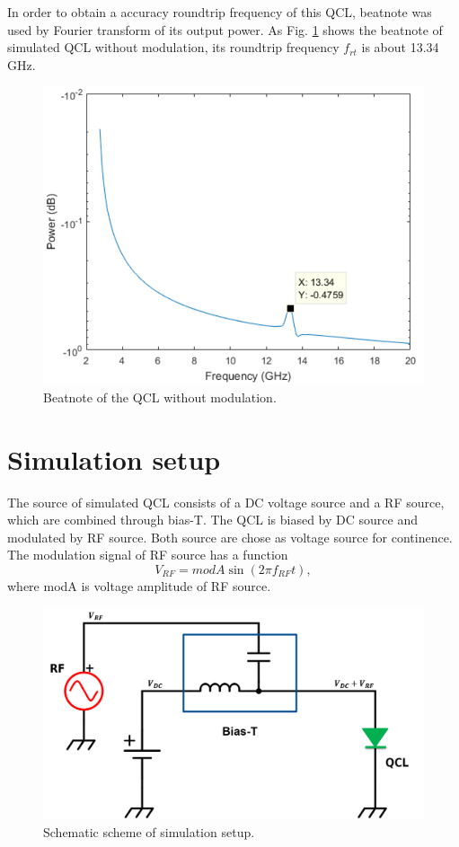 \documentclass[11pt,final]{scrbook}
\begin{document}
In order to obtain a accuracy roundtrip frequency of this QCL, beatnote was used by Fourier transform of its output power. As Fig. \ref{fig:beatnote_noRF} shows the beatnote of simulated QCL without modulation, its roundtrip frequency $f_{rt}$ is about 13.34 GHz.
\begin{figure}[htbp]
\begin{center}
\includegraphics[scale=0.8]{images/beatnote_noRF.pdf}
\caption{Beatnote of the QCL without modulation.}
\label{fig:beatnote_noRF}
\end{center}
\end{figure}


\section{Simulation setup}
The source of simulated QCL consists of a DC voltage source and a RF source, which are combined through bias-T. The QCL is biased by DC source and modulated by RF source. Both source are chose as voltage source for continence. The modulation signal of RF source has a function
\begin{equation}
V_{RF}=modA\sin (2\pi f_{RF}t), \label{eq. V_RF}
 \end{equation}
 where modA is voltage amplitude of RF source.
\begin{figure}[htbp]
\begin{center}
\includegraphics[scale=0.4]{images/schematicSETUP}
\caption{Schematic scheme of simulation setup.}
\label{fig:schematicSETUP}
\end{center}
\end{figure}
\end{document}
